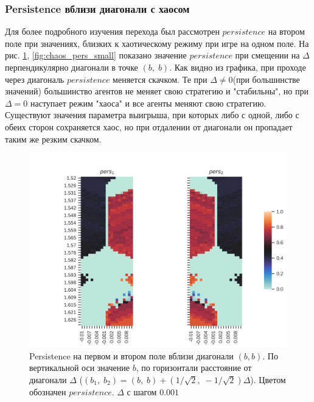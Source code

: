 \documentclass[12pt]{article}
\begin{document}
\subsubsection{Persistence вблизи диагонали с хаосом}
    Для более подробного изучения перехода был рассмотрен $persistence$ на втором поле при значениях, близких к хаотическому режиму при игре на одном поле. На рис. \ref{fig:chaos_pers}, \ref{fig:chaos_pers_small} показано значение $persistence$ при смещении на $\Delta$ перпендикулярно диагонали в точке $(b,\;b)$. Как видно из графика, при проходе через диагональ $persistence$ меняется скачком. Те при $\Delta\neq0$(при большинстве значений) большинство агентов не меняет свою стратегию и "стабильны", но при $\Delta=0$ наступает режим "хаоса" и все агенты меняют свою стратегию. Существуют значения параметра выигрыша, при которых либо с одной, либо с обеих сторон сохраняется хаос, но при отдалении от диагонали он пропадает таким же резким скачком.
    \begin{figure}[H]
         \centering
         \includegraphics[width=0.95\columnwidth, keepaspectratio=True]{DoubleField/double_field_persistence_diag.jpg}
         \caption{Persistence на первом и втором поле вблизи диагонали $(b, b)$. По вертикальной оси значение $b$, по горизонтали расстояние от диагонали $\Delta$ ($(b_1,\;b_2) = (b,\;b) + (1/\sqrt{2},\;-1/\sqrt{2})\Delta$). Цветом обозначен $persistence$. $\Delta$ с шагом $0.001$}
         \label{fig:chaos_pers}
    \end{figure}
\end{document}
